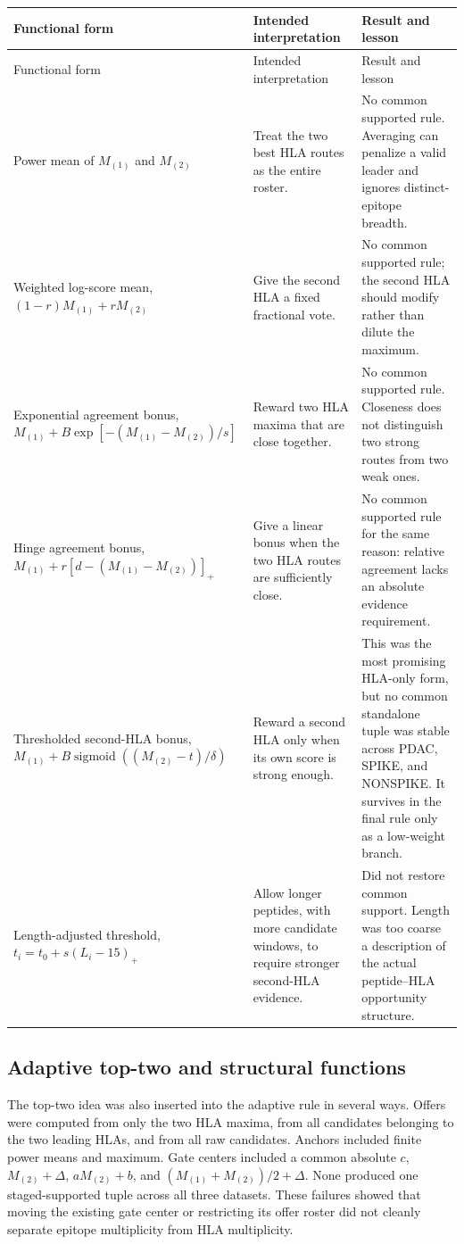 \documentclass[11pt]{article}
\newcommand{\sigmoid}{\operatorname{sigmoid}}
\begin{document}
\begin{longtable}{@{}p{}p{}p{}@{}}
\toprule
Functional form & Intended interpretation & Result and lesson \\
\midrule
\endfirsthead
\toprule
Functional form & Intended interpretation & Result and lesson \\
\midrule
\endhead
Power mean of $M_{(1)}$ and $M_{(2)}$
& Treat the two best HLA routes as the entire roster.
& No common supported rule. Averaging can penalize a valid leader and ignores
distinct-epitope breadth. \\
\addlinespace
Weighted log-score mean,
$(1-r)M_{(1)}+rM_{(2)}$
& Give the second HLA a fixed fractional vote.
& No common supported rule; the second HLA should modify rather than dilute
the maximum. \\
\addlinespace
Exponential agreement bonus,
$M_{(1)}+B\exp[-(M_{(1)}-M_{(2)})/s]$
& Reward two HLA maxima that are close together.
& No common supported rule. Closeness does not distinguish two strong routes
from two weak ones. \\
\addlinespace
Hinge agreement bonus,
$M_{(1)}+r[d-(M_{(1)}-M_{(2)})]_+$
& Give a linear bonus when the two HLA routes are sufficiently close.
& No common supported rule for the same reason: relative agreement lacks an
absolute evidence requirement. \\
\addlinespace
Thresholded second-HLA bonus,
$M_{(1)}+B\sigmoid((M_{(2)}-t)/\delta)$
& Reward a second HLA only when its own score is strong enough.
& This was the most promising HLA-only form, but no common standalone tuple
was stable across PDAC, SPIKE, and NONSPIKE. It survives in the final rule only
as a low-weight branch. \\
\addlinespace
Length-adjusted threshold,
$t_i=t_0+s(L_i-15)_+$
& Allow longer peptides, with more candidate windows, to require stronger
second-HLA evidence.
& Did not restore common support. Length was too coarse a description of the
actual peptide--HLA opportunity structure. \\
\bottomrule
\end{longtable}

\subsection{Adaptive top-two and structural functions}

The top-two idea was also inserted into the adaptive rule in several ways.
Offers were computed from only the two HLA maxima, from all candidates
belonging to the two leading HLAs, and from all raw candidates. Anchors included
finite power means and maximum. Gate centers included a common absolute $c$,
$M_{(2)}+\Delta$, $aM_{(2)}+b$, and
$(M_{(1)}+M_{(2)})/2+\Delta$. None produced one staged-supported tuple across
all three datasets. These failures showed that moving the existing gate center
or restricting its offer roster did not cleanly separate epitope multiplicity
from HLA multiplicity.
\end{document}
